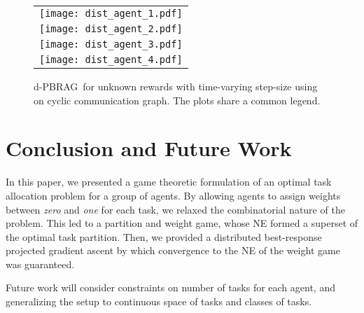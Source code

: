 \documentclass{IEEEtran}
\def \dynacr{PBRAG}
\begin{document}
\begin{figure}
\begin{center}
	\begin{tabular}{c}
		\hspace{-2ex}\texttt{[image: dist\_agent\_1.pdf]} \\
		\hspace{-2ex}\texttt{[image: dist\_agent\_2.pdf]} \\
		\hspace{-2ex}\texttt{[image: dist\_agent\_3.pdf]} \\
		\hspace{-2ex}\texttt{[image: dist\_agent\_4.pdf]}
	\end{tabular}
\end{center}
\caption{d-\dynacr\, for unknown rewards with time-varying step-size
  using~ on cyclic communication graph. The plots
  share a common
  legend.} %
	\label{fig:dist_comm}
\end{figure}


\section{Conclusion and Future Work} \label{sec:conclude}

In this paper, we presented a game theoretic formulation of an optimal task
allocation problem for a group of agents. By allowing
agents to assign weights between \emph{zero} and \emph{one} for each
task, we relaxed the combinatorial nature of the problem. This led to
a partition and weight game, whose NE formed a superset of the optimal
task partition. Then, we provided a distributed best-response projected gradient ascent by which convergence to the NE of the weight game
was guaranteed. %

Future work will consider constraints on number of tasks for each
agent, %
and generalizing the setup to continuous space of tasks and classes of
tasks.


%
%
%

%
\end{document}
